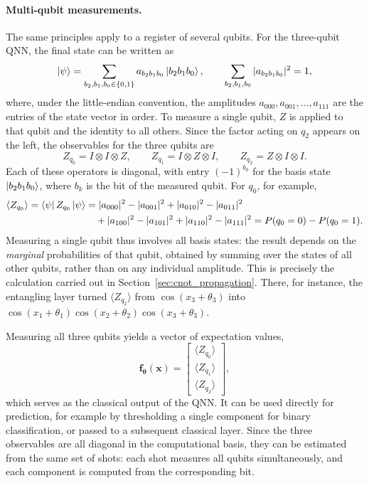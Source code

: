 \documentclass[12pt]{article}
\numberwithin{equation}{section}  %
\begin{document}
\paragraph{Multi-qubit measurements.} The same principles apply to a register of several qubits. For the three-qubit QNN, the final state can be written as
\begin{equation}
\ket{\psi} = \sum_{b_2, b_1, b_0 \in \{0, 1\}} a_{b_2 b_1 b_0} \ket{b_2 b_1 b_0},
\qquad
\sum_{b_2, b_1, b_0} |a_{b_2 b_1 b_0}|^2 = 1,
\end{equation}
where, under the little-endian convention, the amplitudes $a_{000}, a_{001}, \ldots, a_{111}$ are the entries of the state vector in order. To measure a single qubit, $Z$ is applied to that qubit and the identity to all others. Since the factor acting on $q_2$ appears on the left, the observables for the three qubits are
\begin{equation}
Z_{q_0} = I \otimes I \otimes Z, \qquad
Z_{q_1} = I \otimes Z \otimes I, \qquad
Z_{q_2} = Z \otimes I \otimes I.
\end{equation}
Each of these operators is diagonal, with entry $(-1)^{b_k}$ for the basis state $\ket{b_2 b_1 b_0}$, where $b_k$ is the bit of the measured qubit. For $q_0$, for example,
\begin{equation}
\begin{aligned}
\langle Z_{q_0} \rangle = \bra{\psi} Z_{q_0} \ket{\psi}
&= |a_{000}|^2 - |a_{001}|^2 + |a_{010}|^2 - |a_{011}|^2 \\
&\quad + |a_{100}|^2 - |a_{101}|^2 + |a_{110}|^2 - |a_{111}|^2
= P(q_0 = 0) - P(q_0 = 1).
\end{aligned}
\end{equation}
Measuring a single qubit thus involves all basis states: the result depends on the \emph{marginal} probabilities of that qubit, obtained by summing over the states of all other qubits, rather than on any individual amplitude. This is precisely the calculation carried out in Section~\ref{sec:cnot_propagation}. There, for instance, the entangling layer turned $\langle Z_{q_2} \rangle$ from $\cos(x_3 + \theta_3)$ into $\cos(x_1 + \theta_1)\cos(x_2 + \theta_2)\cos(x_3 + \theta_3)$.

Measuring all three qubits yields a vector of expectation values,
\begin{equation}
\mathbf{f}_{\boldsymbol{\theta}}(\mathbf{x}) =
\begin{bmatrix} \langle Z_{q_0} \rangle \\ \langle Z_{q_1} \rangle \\ \langle Z_{q_2} \rangle \end{bmatrix},
\end{equation}
which serves as the classical output of the QNN. It can be used directly for prediction, for example by thresholding a single component for binary classification, or passed to a subsequent classical layer. Since the three observables are all diagonal in the computational basis, they can be estimated from the same set of shots: each shot measures all qubits simultaneously, and each component is computed from the corresponding bit.
\end{document}

